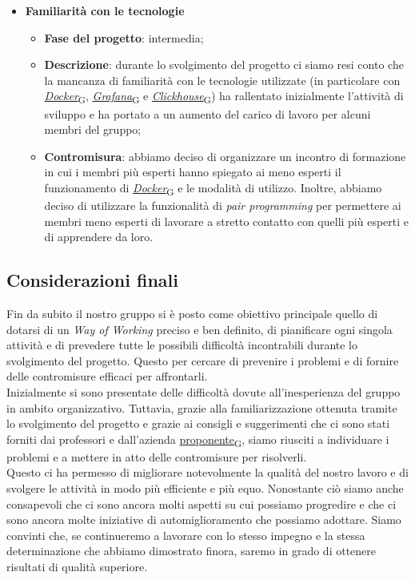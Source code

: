 \begin{itemize}
\begin{itemize}
    \end{itemize}
    \item \textbf{Familiarità con le tecnologie}
    \begin{itemize}
        \item \textbf{Fase del progetto}: intermedia;
        \item \textbf{Descrizione}: durante lo svolgimento del progetto ci siamo resi conto che la mancanza di familiarità con le tecnologie utilizzate (in particolare con \href{https://7last.github.io/docs/pb/documentazione-interna/glossario\#docker}{\textit{Docker}\textsubscript{G}}, \href{https://7last.github.io/docs/pb/documentazione-interna/glossario\#grafana}{\textit{Grafana}\textsubscript{G}} e \href{https://7last.github.io/docs/pb/documentazione-interna/glossario\#clickhouse}{\textit{Clickhouse}\textsubscript{G}}) ha rallentato inizialmente l'attività di sviluppo e ha portato a un aumento del carico di lavoro per alcuni membri del gruppo;
        \item \textbf{Contromisura}: abbiamo deciso di organizzare un incontro di formazione in cui i membri più esperti hanno spiegato ai meno esperti il funzionamento di \href{https://7last.github.io/docs/pb/documentazione-interna/glossario\#docker}{\textit{Docker}\textsubscript{G}} e le modalità di utilizzo. Inoltre, abbiamo deciso di utilizzare la funzionalità di \textit{pair programming} per permettere ai membri meno esperti di lavorare a stretto contatto con quelli più esperti e di apprendere da loro.
    \end{itemize}
\end{itemize}

\subsection{Considerazioni finali}
Fin da subito il nostro gruppo si è posto come obiettivo principale quello di dotarsi di un \textit{Way of Working} preciso e ben definito, di pianificare ogni singola attività e di prevedere tutte le possibili difficoltà incontrabili durante lo svolgimento del progetto. Questo per cercare di prevenire i problemi e di fornire delle contromisure efficaci per affrontarli. \\
Inizialmente si sono presentate delle difficoltà dovute all'inesperienza del gruppo in ambito organizzativo. Tuttavia, grazie alla familiarizzazione ottenuta tramite lo svolgimento del progetto e grazie ai consigli e suggerimenti che ci sono stati forniti dai professori e dall'azienda \href{https://7last.github.io/docs/pb/documentazione-interna/glossario\#proponente}{proponente\textsubscript{G}}, siamo riusciti a individuare i problemi e a mettere in atto delle contromisure per risolverli. \\
Questo ci ha permesso di migliorare notevolmente la qualità del nostro lavoro e di svolgere le attività in modo più efficiente e più equo. Nonostante ciò siamo anche consapevoli che ci sono ancora molti aspetti su cui possiamo progredire e che ci sono ancora molte iniziative di automiglioramento che possiamo adottare. Siamo convinti che, se continueremo a lavorare con lo stesso impegno e la stessa determinazione che abbiamo dimostrato finora, saremo in grado di ottenere risultati di qualità superiore.
